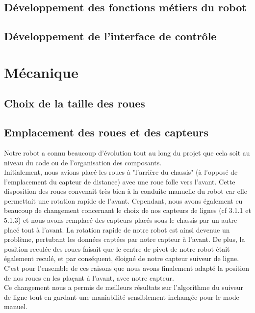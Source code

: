\documentclass[a4paper, 12pt]{report}
\begin{document}
\subsection{Développement des fonctions métiers du robot}

\subsection{Développement de l'interface de contrôle}
\section{Mécanique}
\subsection{Choix de la taille des roues}
\subsection{Emplacement des roues et des capteurs}
Notre robot a connu beaucoup d'évolution tout au long du projet que cela soit au niveau du code ou de l'organisation des composants.
\\
Initialement, nous avions placé les roues à "l'arrière du chassis" (à l'opposé de l'emplacement du capteur de distance) avec une roue folle vers l'avant. Cette disposition des roues convenait très bien à la conduite manuelle du robot car elle permettait une rotation rapide de l'avant. Cependant, nous avons également eu beaucoup de changement concernant le choix de nos capteurs de lignes (cf 3.1.1 et 5.1.3) et nous avons remplacé des capteurs placés sous le chassis par un autre placé tout à l'avant. La rotation rapide de notre robot est ainsi devenue un problème, pertubant les données captées par notre capteur à l'avant. De plus, la position reculée des roues faisait que le centre de pivot de notre robot était également reculé, et par conséquent, éloigné de notre capteur suiveur de ligne. C'est pour l'ensemble de ces raisons que nous avons finalement adapté la position de nos roues en les plaçant à l'avant, avec notre capteur.
\\
Ce changement nous a permis de meilleurs résultats sur l'algorithme du suiveur de ligne tout en gardant une maniabilité sensiblement inchangée pour le mode manuel.
\end{document}
